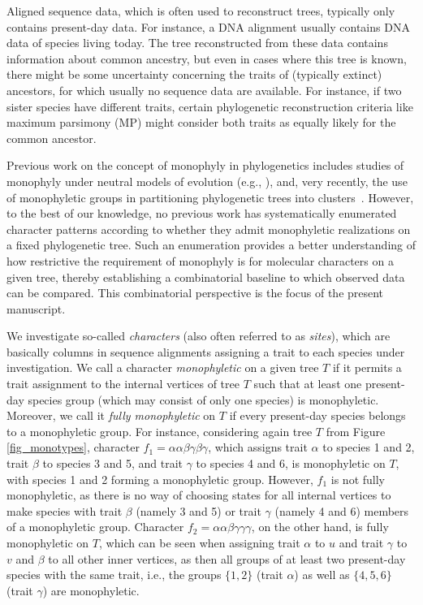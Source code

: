 \documentclass{amsart}
\theoremstyle{definition}
\begin{document}
Aligned sequence data, which is often used to reconstruct trees, typically only contains present-day data. For instance, a DNA alignment usually contains DNA data of species living today. The tree reconstructed from these data contains information about common ancestry, but even in cases where this tree is known, there might be some uncertainty concerning the traits of (typically extinct) ancestors, for which usually no sequence data are available. For instance, if two sister species have different traits, certain phylogenetic reconstruction criteria like maximum parsimony (MP) \cite{Fitch,Hartigan1973} might consider both traits as equally likely for the common ancestor. 

Previous work on the concept of monophyly in phylogenetics includes studies of monophyly under neutral models of evolution (e.g., \cite{Zhu2011,Mehta2016}), and, very recently, the use of monophyletic groups in partitioning phylogenetic trees into clusters~\cite{Ganesan2025}. However, to the best of our knowledge, no previous work has systematically enumerated character patterns according to whether they admit monophyletic realizations on a fixed phylogenetic tree. Such an enumeration provides a better understanding of how restrictive the requirement of monophyly is for molecular characters on a given tree, thereby establishing a combinatorial baseline to which observed data can be compared. This combinatorial perspective is the focus of the present manuscript.

We investigate so-called \emph{characters} (also often referred to as \emph{sites}), which are basically columns in sequence alignments assigning a trait to each species under investigation. We call a character \emph{monophyletic} on a given tree $T$ if it permits a trait assignment to the internal vertices of tree $T$ such that at least one present-day species group (which may consist of only one species) is monophyletic. 
Moreover, we call it \emph{fully monophyletic} on $T$ if every present-day species belongs to a monophyletic group. 
For instance, considering again tree $T$ from Figure \ref{fig_monotypes}, character $f_1=\alpha \alpha \beta \gamma \beta \gamma$, which assigns trait $\alpha$ to species 1 and 2, trait $\beta$ to species 3 and 5, and trait $\gamma$ to species 4 and 6, is monophyletic on $T$, with species 1 and 2 forming a monophyletic group. 
However, $f_1$ is not fully monophyletic, as there is no way of choosing states for all internal vertices to make species with trait $\beta$ (namely 3 and 5) or trait $\gamma$ (namely 4 and 6) members of a monophyletic group.  Character $f_2=\alpha \alpha \beta \gamma \gamma \gamma$, on the other hand, is fully monophyletic on $T$, which can be seen when assigning trait $\alpha$ to $u$ and trait $\gamma$ to $v$ and $\beta$ to all other inner vertices, as then all groups of at least two present-day species with the same trait, i.e., the groups $\{1,2\}$ (trait $\alpha$) as well as $\{4,5,6\}$ (trait $\gamma$) are monophyletic.
\end{document}

